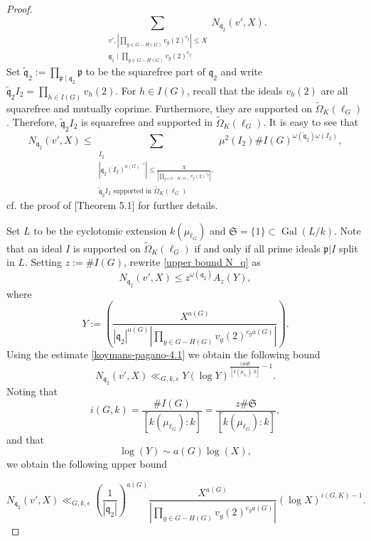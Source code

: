 \documentclass[11pt]{amsart}
\newcommand{\fq}{\mathfrak{q}}
\newcommand{\fp}{\mathfrak{p}}
\newcommand{\op}[1]{\operatorname{#1}}
\numberwithin{equation}{section}
\begin{document}
\begin{proof}
\begin{equation}
        \sum_{\substack{v',|\prod_{g \in G-H(G)}v_g(2)^{e_g}|\leq X\\ \fq_1 \mid \prod_{g \in G-H(G)}v_g(2)^{e_g}}}N_{\fq_2}(v',X).
    \end{equation}
    Set $\widetilde{\fq}_2:= \prod_{\fp \mid \fq_2} \fp$ to be the squarefree part of $\fq_2$ and write $\widetilde{\fq}_2 I_2=\prod_{h\in I(G)}v_h(2)$. For $h\in I(G)$, recall that the ideals $v_h(2)$ are all squarefree and mutually coprime. Furthermore, they are supported on $\widetilde{\Omega}_K(\ell_G)$. Therefore, $\widetilde{\fq}_2 I_2$ is squarefree and supported in $\widetilde{\Omega}_K(\ell_G)$. It is easy to see that
    \begin{equation}\label{upper bound N_q}
    N_{\fq_2}(v',X)\leq \sum_{\substack{I_2\\ |\fq_2\left(I_2\right)^{a(G)^{-1}}| \leq \frac{X}{|\prod_{g \in G-H(G)}v_g(2)^{e_g}|},\\ \widetilde{\fq}_2I_2 \text{ supported in }\widetilde{\Omega}_K(\ell_G)}} \mu^2(I_2)\#I(G)^{\omega(\widetilde{\fq}_2)\omega(I_2)},
    \end{equation}
    cf. the proof of \cite{koymanspagano2023}[Theorem 5.1] for further details.

    \par Set $L$ to be the cyclotomic extension $k(\mu_{\ell_G})$ and $\mathfrak{S}=\{1\}\subset \op{Gal}(L/k)$. Note that an ideal $I$ is supported on $\widetilde{\Omega}_K(\ell_G)$ if and only if all prime ideals $\fp|I$ split in $L$. Setting $z:=\# I(G)$, rewrite \eqref{upper bound N_q} as
    \[N_{\fq_2}(v',X)\leq z^{\omega(\fq_2)} A_z\left(Y\right),\]
    where 
    \[Y:=\left(\frac{X^{a(G)}}{|\fq_2|^{a(G)}|\prod_{g \in G-H(G)}v_g(2)^{e_g a(G)}|}\right).\]
    Using the estimate \eqref{koymans-pagano-4.1} we obtain the following bound
\[ N_{\fq_2}(v',X) \ll_{G,k,\epsilon} Y (\log Y)^{\frac{z\#\mathfrak{S}}{[k(\mu_{\ell_G}):k]}-1}.
\]
Noting that \[i(G,k)=\frac{\#I(G)}{[k(\mu_{\ell_G}):k]}=\frac{z\# \mathfrak{S}}{[k(\mu_{\ell_G}):k]},\]
and that 
\[\log(Y)\sim a(G) \log(X),\]we obtain the following upper bound
    
    \begin{equation}\label{N q_2 final bound}
   N_{\fq_2}(v',X) \ll_{G,k,\epsilon} \left(\frac{1}{|\fq_2|}\right)^{a(G)}\frac{X^{a(G)}}{|\prod_{g \in G-H(G)}v_g(2)^{e_g a(G)}|}(\log X)^{i(G,K)-1}.
    \end{equation}


\end{proof}
\end{document}
